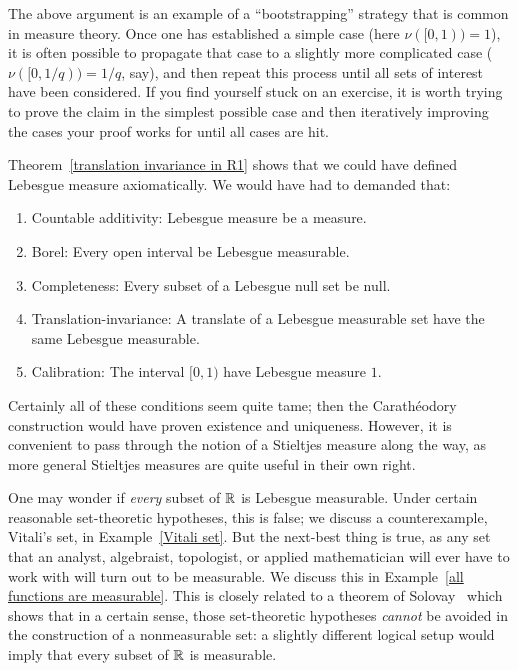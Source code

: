 \begin{subsec}
The above argument is an example of a ``bootstrapping'' strategy that is common in measure theory.
Once one has established a simple case (here $\nu([0, 1)) = 1$), it is often possible to propagate that case to a slightly more complicated case ($\nu([0, 1/q)) = 1/q$, say), and then repeat this process until all sets of interest have been considered.
If you find yourself stuck on an exercise, it is worth trying to prove the claim in the simplest possible case and then iteratively improving the cases your proof works for until all cases are hit.
\end{subsec}

\begin{subsec}
Theorem~\ref{translation invariance in R1} shows that we could have defined Lebesgue measure axiomatically. We would have had to demanded that:
\begin{enumerate}
\item Countable additivity: Lebesgue measure be a measure.
\item Borel: Every open interval be Lebesgue measurable.
\item Completeness: Every subset of a Lebesgue null set be null.
\item Translation-invariance: A translate of a Lebesgue measurable set have the same Lebesgue measurable.
\item Calibration: The interval $[0, 1)$ have Lebesgue measure $1$.
\end{enumerate}
Certainly all of these conditions seem quite tame; then the Carathéodory construction would have proven existence and uniqueness.
However, it is convenient to pass through the notion of a Stieltjes measure along the way, as more general Stieltjes measures are quite useful in their own right.
\end{subsec}

\begin{subsec}
One may wonder if \emph{every} subset of $\mathbb{R}$ is Lebesgue measurable.
Under certain reasonable set-theoretic hypotheses, this is false; we discuss a counterexample, Vitali's set, in Example~\ref{Vitali set}.
But the next-best thing is true, as any set that an analyst, algebraist, topologist, or applied mathematician will ever have to work with will turn out to be measurable. We discuss this in Example~\ref{all functions are measurable}.
This is closely related to a theorem of Solovay~\cite{Solovay1970} which shows that in a certain sense, those set-theoretic hypotheses \emph{cannot} be avoided in the construction of a nonmeasurable set: a slightly different logical setup would imply that every subset of $\mathbb{R}$ is measurable.
\end{subsec}


